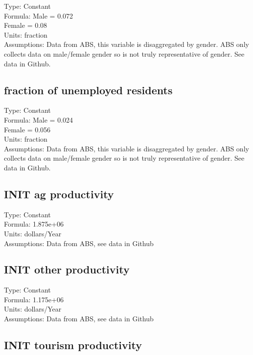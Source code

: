 \documentclass[
  11pt,
]{book}
\begin{document}
Type: Constant\\
Formula: Male = 0.072\\
Female = 0.08\\
Units: fraction\\
Assumptions: Data from ABS, this variable is disaggregated by gender. ABS only collects data on male/female gender so is not truly representative of gender. See data in Github.

\hypertarget{fraction-of-unemployed-residents}{%
\subsection{fraction of unemployed residents}\label{fraction-of-unemployed-residents}}

Type: Constant\\
Formula: Male = 0.024\\
Female = 0.056\\
Units: fraction\\
Assumptions: Data from ABS, this variable is disaggregated by gender. ABS only collects data on male/female gender so is not truly representative of gender. See data in Github.

\hypertarget{init-ag-productivity}{%
\subsection{INIT ag productivity}\label{init-ag-productivity}}

Type: Constant\\
Formula: 1.875e+06\\
Units: dollars/Year\\
Assumptions: Data from ABS, see data in Github

\hypertarget{init-other-productivity}{%
\subsection{INIT other productivity}\label{init-other-productivity}}

Type: Constant\\
Formula: 1.175e+06\\
Units: dollars/Year\\
Assumptions: Data from ABS, see data in Github

\hypertarget{init-tourism-productivity}{%
\subsection{INIT tourism productivity}\label{init-tourism-productivity}}
\end{document}
